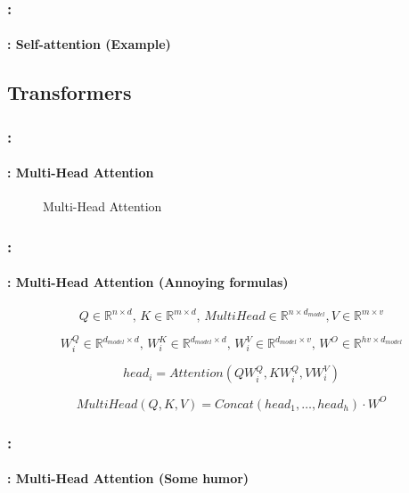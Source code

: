 \documentclass[xcolor=table]{beamer}
\begin{document}
\begin{frame}
	\frametitle{\insertshortsubtitle: \insertsection}
	\framesubtitle{\insertsubsection: Self-attention (Example)}
	
	\begin{center}
	\end{center}
	
\end{frame}


\subsection{Transformers}

\begin{frame}
	\frametitle{\insertshortsubtitle: \insertsection}
	\framesubtitle{\insertsubsection: Multi-Head Attention}
	
	\vspace{-6pt}
	\begin{figure}
		\centering
		\vspace{-6pt}
		\caption{Multi-Head Attention \cite{2017-vaswani-al}}
	\end{figure}

\end{frame}

\begin{frame}
	\frametitle{\insertshortsubtitle: \insertsection}
	\framesubtitle{\insertsubsection: Multi-Head Attention (Annoying formulas)}
	
	\[Q \in \mathbb{R}^{n \times d}, \, K \in \mathbb{R}^{m \times d}, \, MultiHead \in \mathbb{R}^{n \times d_{model}}, V \in \mathbb{R}^{m \times v} \]
	
	\[W^Q_i \in \mathbb{R}^{d_{model} \times d}, \,  W^K_i \in \mathbb{R}^{d_{model} \times d}, \, W^V_i \in \mathbb{R}^{d_{model} \times v}, \, W^O \in \mathbb{R}^{hv \times d_{model}}\]
	
	\[head_i = Attention(Q W^Q_i, K W^Q_i, V W^V_i)\]
	
	\[MultiHead(Q, K, V) = Concat(head_1, \ldots, head_h) \cdot W^O\]
	
\end{frame}


\begin{frame}
	\frametitle{\insertshortsubtitle: \insertsection}
	\framesubtitle{\insertsubsection: Multi-Head Attention (Some humor)}
	
	
\end{frame}
\end{document}
